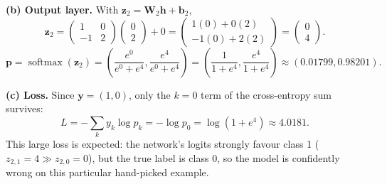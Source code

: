 \documentclass[10pt,a4paper]{article}
\newcommand{\vect}[1]{\bm{#1}}
\begin{document}
\begin{answerbox}
\textbf{(b) Output layer.} With $\vect z_2=\vect W_2\vect h+\vect b_2$,
\[
\vect z_2=\begin{pmatrix}1&0\\-1&2\end{pmatrix}\begin{pmatrix}0\\2\end{pmatrix}+0
=\begin{pmatrix}1(0)+0(2)\\-1(0)+2(2)\end{pmatrix}
=\begin{pmatrix}0\\4\end{pmatrix}.
\]
\[
\vect p=\operatorname{softmax}(\vect z_2)
=\left(\frac{e^0}{e^0+e^4},\frac{e^4}{e^0+e^4}\right)
=\left(\frac{1}{1+e^4},\frac{e^4}{1+e^4}\right)
\approx(0.01799,0.98201).
\]

\textbf{(c) Loss.} Since $\vect y=(1,0)$, only the $k=0$ term of the cross-entropy sum survives:
\[
L=-\sum_k y_k\log p_k=-\log p_0=\log(1+e^4)\approx4.0181.
\]
This large loss is expected: the network's logits strongly favour class 1 ($z_{2,1}=4\gg z_{2,0}=0$), but the true label is class 0, so the model is confidently wrong on this particular hand-picked example.
\end{answerbox}
\end{document}
